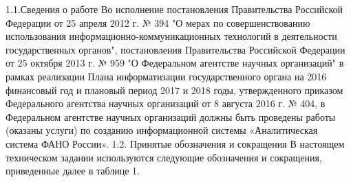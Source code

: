 

1.1.Сведения о работе
Во исполнение постановления Правительства Российской Федерации от 25 апреля 2012 г. № 394 "О мерах по совершенствованию использования информационно-коммуникационных технологий в деятельности государственных органов", постановления Правительства Российской Федерации от 25 октября 2013 г. № 959  "О Федеральном агентстве научных организаций" в рамках реализации Плана информатизации государственного органа  на 2016 финансовый год и плановый период 2017 и 2018 годы, утвержденного приказом Федерального агентства научных организаций от 8 августа 2016 г. № 404, в Федеральном агентстве научных организаций должны быть проведены работы (оказаны услуги) по созданию информационной системы «Аналитическая система ФАНО России».
1.2. Принятые обозначения и сокращения
В настоящем техническом задании используются следующие обозначения и сокращения, приведенные далее в таблице 1.

